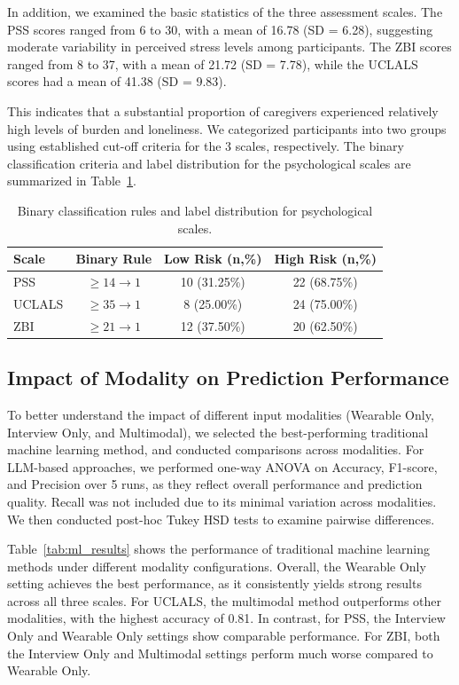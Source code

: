 \documentclass[letterpaper, 10 pt, conference]{ieeeconf}  %
\begin{document}
In addition, we examined the basic statistics of the three assessment scales. The PSS scores ranged from 6 to 30, with a mean of 16.78 (SD = 6.28), suggesting moderate variability in perceived stress levels among participants. The ZBI scores ranged from 8 to 37, with a mean of 21.72 (SD = 7.78), while the UCLALS scores had a mean of 41.38 (SD = 9.83). 

This indicates that a substantial proportion of caregivers experienced relatively high levels of burden and loneliness. We categorized participants into two groups using established cut-off criteria for the 3 scales, respectively. The binary classification criteria and label distribution for the psychological scales are summarized in Table~\ref{tab:label_distribution}.

\begin{table}[t]
\centering
\caption{Binary classification rules and label distribution for psychological scales.}
\label{tab:label_distribution}
\begin{tabular}{lccc}
\hline
\textbf{Scale} & \textbf{Binary Rule} & \textbf{Low Risk (n,\%)} & \textbf{High Risk (n,\%)} \\
\hline
PSS\cite{pss} & $\geq 14 \rightarrow 1$ & 10 (31.25\%) & 22 (68.75\%) \\
UCLALS\cite{ucla} & $\geq 35 \rightarrow 1$ & 8 (25.00\%) & 24 (75.00\%) \\
ZBI\cite{ZBI} & $\geq 21 \rightarrow 1$ & 12 (37.50\%) & 20 (62.50\%) \\
\hline
\end{tabular}
\end{table}

\subsection{Impact of Modality on Prediction Performance}
To better understand the impact of different input modalities (Wearable Only, Interview Only, and Multimodal), we selected the best-performing traditional machine learning method,  and conducted comparisons across modalities. For LLM-based approaches, we performed one-way ANOVA on Accuracy, F1-score, and Precision over 5 runs, as they reflect overall performance and prediction quality. Recall was not included due to its minimal variation across modalities. We then conducted post-hoc Tukey HSD tests to examine pairwise differences.

Table~\ref{tab:ml_results} shows the performance of traditional machine learning methods under different modality configurations. Overall, the Wearable Only setting achieves the best performance, as it consistently yields strong results across all three scales. For UCLALS, the multimodal method outperforms other modalities, with the highest accuracy of 0.81. In contrast, for PSS, the Interview Only and Wearable Only settings show comparable performance. For ZBI, both the Interview Only and Multimodal settings perform much worse compared to Wearable Only.
\end{document}

